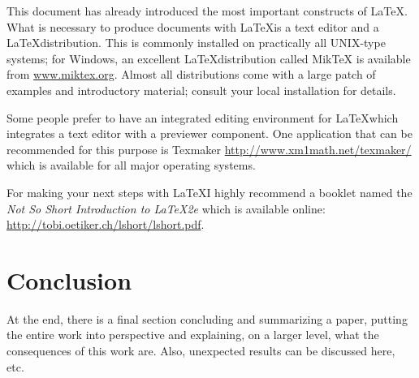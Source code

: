 \documentclass[12pt,twoside]{article}
\begin{document}
This document has already introduced the most important constructs of
\LaTeX. What is necessary to produce documents with \LaTeX is a text editor
and a \LaTeX distribution. This is commonly installed on practically all
UNIX-type systems; for Windows, an excellent \LaTeX distribution called
MikTeX is available from \url{www.miktex.org}. Almost all distributions
come with a large patch of examples and introductory material; consult your
local installation for details.

Some people prefer to have an integrated editing environment for \LaTeX which
integrates a text editor with a previewer component. One application that can be
recommended for this purpose is Texmaker \url{http://www.xm1math.net/texmaker/} which
is available for all major operating systems.

For making your next steps with \LaTeX I highly recommend a booklet \cite{lshort} named the
\emph{Not So Short Introduction to \LaTeX2e} which is available online: \url{http://tobi.oetiker.ch/lshort/lshort.pdf}.


\section{Conclusion}
\label{sec:concl}

At the end, there is a final section concluding and summarizing a
paper, putting the entire work into perspective and explaining, on a
larger level, what the consequences of this work are. Also, unexpected
results can be discussed here, etc.




\end{document}
